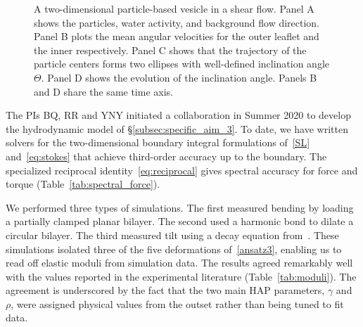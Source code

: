 \begin{figure}
  \vspace{-25pt}
    \caption{\label{fig:tank_treading} \footnotesize A two-dimensional
    particle-based vesicle in a shear flow. Panel A shows the particles,
    water activity, and background flow direction. Panel B plots the
    mean angular velocities for the outer leaflet and the inner
    respectively.  Panel C shows that the trajectory of the particle
    centers forms two ellipses with well-defined inclination angle
    $\Theta$. Panel D shows the evolution of the inclination angle.
    Panels B and D share the same time axis.}
\end{figure}
The PIs BQ, RR and YNY initiated a collaboration in Summer 2020 to
develop the hydrodynamic model of \S\ref{subsec:specific_aim_3}.  To
date, we have written solvers for the two-dimensional boundary integral
formulations of~\eqref{SL} and~\eqref{eq:stokes} that achieve
third-order accuracy up to the boundary. The specialized reciprocal
identity~\eqref{eq:reciprocal} gives spectral accuracy for force and
torque (Table~\ref{tab:spectral_force}).

We performed three types of simulations. The first measured bending by
loading a partially clamped planar bilayer. The second used a harmonic
bond to dilate a circular bilayer. The third measured tilt using a decay
equation from~\cite{KUZMIN2005}. These simulations isolated three of the
five deformations of~\eqref{ansatz3}, enabling us to read off elastic
moduli from simulation data. The results agreed remarkably well with the
values reported in the experimental literature (Table~\ref{tab:moduli}).
The agreement is underscored by the fact that the two main HAP
parameters, $\gamma$ and $\rho$, were assigned physical values from the
outset rather than being tuned to fit data. 


